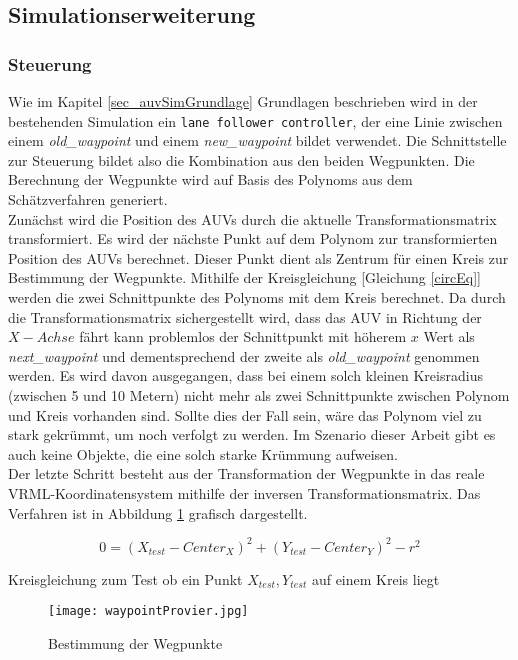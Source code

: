 \subsection{Simulationserweiterung}
\subsubsection{Steuerung}
\label{sec_waypoint}
Wie im Kapitel \ref{sec_auvSimGrundlage} Grundlagen beschrieben wird in der bestehenden Simulation ein \texttt{lane follower controller}, der eine Linie zwischen einem \textit{old\_waypoint} und einem \textit{new\_waypoint} bildet verwendet.
Die Schnittstelle zur Steuerung bildet also die Kombination aus den beiden Wegpunkten. Die Berechnung der Wegpunkte wird auf Basis des Polynoms aus dem Schätzverfahren generiert.\\
Zunächst wird die Position des AUVs durch die aktuelle Transformationsmatrix transformiert. Es wird der nächste Punkt auf dem Polynom zur transformierten Position des AUVs berechnet. Dieser Punkt dient als Zentrum für einen Kreis zur Bestimmung der Wegpunkte. Mithilfe der Kreisgleichung [Gleichung \ref{circEq}] werden die zwei Schnittpunkte des Polynoms mit dem Kreis berechnet. Da durch die Transformationsmatrix sichergestellt wird, dass das AUV in Richtung der $X-Achse$ fährt kann problemlos der Schnittpunkt mit höherem $x$ Wert als \textit{next\_waypoint} und dementsprechend der zweite als \textit{old\_waypoint} genommen werden. Es wird davon ausgegangen, dass bei einem solch kleinen Kreisradius (zwischen 5 und 10 Metern) nicht mehr als zwei Schnittpunkte zwischen Polynom und Kreis vorhanden sind. Sollte dies der Fall sein, wäre das Polynom viel zu stark gekrümmt, um noch verfolgt zu werden. Im Szenario dieser Arbeit gibt es auch keine Objekte, die eine solch starke Krümmung aufweisen.\\
Der letzte Schritt besteht aus der Transformation der Wegpunkte in das reale VRML-Koordinatensystem mithilfe der inversen Transformationsmatrix.
Das Verfahren ist in Abbildung \ref{wpCircle} grafisch dargestellt.

\begin{ownequation}[H]
\begin{equation}
0 = (X_{test}-Center_X)^2+(Y_{test}-Center_Y)^2 - r^2
\end{equation}
\caption{Kreisgleichung zum Test ob ein Punkt $X_{test},Y_{test}$ auf einem Kreis liegt}
\label{circEq}
\end{ownequation}

\begin{figure}[H]
\centering
\texttt{[image: waypointProvier.jpg]}
\caption{Bestimmung der Wegpunkte}
\label{wpCircle}
\end{figure}
